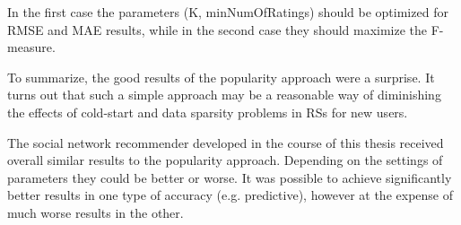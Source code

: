 \documentclass[12pt]{report}
\begin{document}
In the first case the parameters (K, minNumOfRatings) should be optimized for RMSE and MAE results, while in the second case they should maximize the F-measure.

\hbox{}
To summarize, the good results of the popularity approach were a surprise. It turns out that such a simple approach may be a reasonable way of diminishing the effects of cold-start and data sparsity problems in RSs for new users. 

The social network recommender developed in the course of this thesis received overall similar results to the popularity approach. Depending on the settings of parameters they could be better or worse. It was possible to achieve significantly better results in one type of accuracy (e.g. predictive), however at the expense of much worse results in the other.




\end{document}
